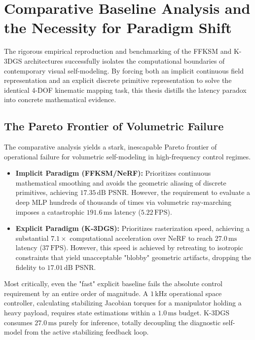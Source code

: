 \documentclass[12pt,a4paper,oneside]{report}
\begin{document}
\section{Comparative Baseline Analysis and the Necessity for Paradigm Shift}

The rigorous empirical reproduction and benchmarking of the FFKSM and K-3DGS architectures successfully isolates the computational boundaries of contemporary visual self-modeling. By forcing both an implicit continuous field representation and an explicit discrete primitive representation to solve the identical 4-DOF kinematic mapping task, this thesis distills the latency paradox into concrete mathematical evidence.

\subsection{The Pareto Frontier of Volumetric Failure}

The comparative analysis yields a stark, inescapable Pareto frontier of operational failure for volumetric self-modeling in high-frequency control regimes.

\begin{itemize}
    \item \textbf{Implicit Paradigm (FFKSM/NeRF):} Prioritizes continuous mathematical smoothing and avoids the geometric aliasing of discrete primitives, achieving $17.35\,\mathrm{dB}$ PSNR. However, the requirement to evaluate a deep MLP hundreds of thousands of times via volumetric ray-marching imposes a catastrophic $191.6\,\mathrm{ms}$ latency ($5.22\,\mathrm{FPS}$).
    \item \textbf{Explicit Paradigm (K-3DGS):} Prioritizes rasterization speed, achieving a substantial $7.1\times$ computational acceleration over NeRF to reach $27.0\,\mathrm{ms}$ latency ($37\,\mathrm{FPS}$). However, this speed is achieved by retreating to isotropic constraints that yield unacceptable "blobby" geometric artifacts, dropping the fidelity to $17.01\,\mathrm{dB}$ PSNR.
\end{itemize}

Most critically, even the "fast" explicit baseline fails the absolute control requirement by an entire order of magnitude. A $1\,\mathrm{kHz}$ operational space controller, calculating stabilizing Jacobian torques for a manipulator holding a heavy payload, requires state estimations within a $1.0\,\mathrm{ms}$ budget. K-3DGS consumes $27.0\,\mathrm{ms}$ purely for inference, totally decoupling the diagnostic self-model from the active stabilizing feedback loop. 
\end{document}

